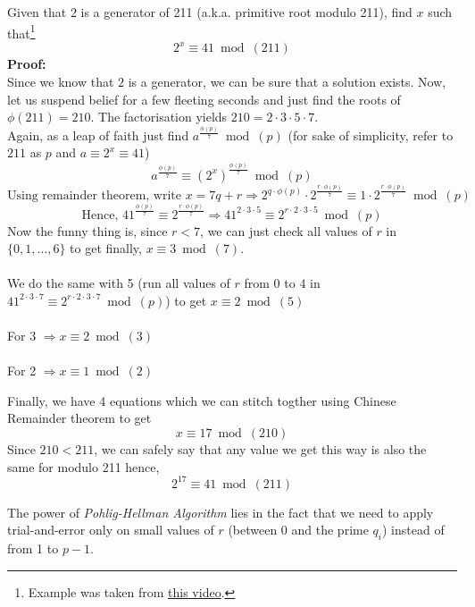 		\begin{tcolorbox}[breakable, title=Illustration,colback=brown!5!white,colframe=brown!75!black,colbacktitle=yellow!50!red,coltitle=red!25!black,fonttitle=\bfseries,subtitle style={boxrule=0.4pt,colback=yellow!50!red!25!white} ]
			
			Given that \(2\) is a generator of 211 (a.k.a. primitive root modulo 211), find \(x\) such that\footnote{Example was taken from \href{https://bit.ly/3O8XIKX}{this video}.} \[2^x \equiv 41 \bmod(211)\]
			\textbf{Proof:}\\
			Since we know that $2$ is a generator, we can be sure that a solution exists. Now, let us suspend belief for a few fleeting seconds and just find the roots of \(\phi(211)= 210\). The factorisation yields \(210 = 2\cdot 3\cdot 5\cdot 7\).\\
			Again, as a leap of faith just find \(a^\frac{\phi(p)}{7} \bmod(p)\) (for sake of simplicity, refer to \(211\) as $p$ and \(a \equiv 2^x \equiv 41\))
			\[a^\frac{\phi(p)}{7}\equiv (2^x)^\frac{\phi(p)}{7} \bmod(p) \]
			\[\text{Using remainder theorem, write } x=7q +r \Rightarrow 2^{q\cdot \phi(p)}\cdot 2^\frac{r\cdot\phi(p)}{7}\equiv 1\cdot 2^\frac{r\cdot\phi(p)}{7} \bmod(p)\]
			\[\text{Hence, } 41^\frac{\phi(p)}{7}\equiv 2^\frac{r\cdot\phi(p)}{7}\Rightarrow 41^{2\cdot 3\cdot 5}\equiv 2^{r\cdot 2 \cdot 3\cdot 5} \bmod(p)\]
			Now the funny thing is, since \(r<7\), we can just check all values of $r$ in \(\{0, 1, \ldots , 6\}\) to get finally, \(x\equiv 3 \bmod(7)\). \\~\\
			We do the same with 5 (run all values of $r$ from \(0\) to \(4\) in \(41^{2\cdot 3\cdot 7}\equiv 2^{r\cdot 2 \cdot 3\cdot 7} \bmod(p)\)) to get \(x\equiv 2 \bmod(5)\)\\~\\
			For 3 \(\Rightarrow x\equiv 2 \bmod(3)\)\\~\\
			For 2 \(\Rightarrow x \equiv 1 \bmod(2)\)\par
			Finally, we have 4 equations which we can stitch togther using Chinese Remainder theorem to get \[x\equiv 17 \bmod(210) \]
			Since $210<211$, we can safely say that any value we get this way is also the same for modulo 211 hence, \[2^{17} \equiv 41 \bmod(211)\]

		\end{tcolorbox}

		The power of \emph{Pohlig-Hellman Algorithm} lies in the fact that we need to apply trial-and-error only on small values of \(r\) (between 0 and the prime \(q_i\)) instead of from 1 to \(p-1\).

